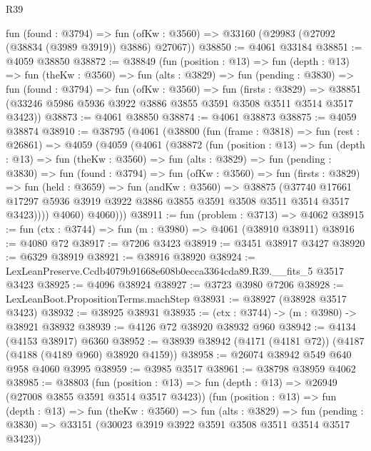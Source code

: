 \begin{lexlean}{R39}
\begin{coremodule}
    fun (found : @3794) =>
    fun (ofKw : @3560) => @33160 (@29983 (@27092 (@38834 (@3989 @3919)) @3886) @27067))
@38850 := @4061 @33184
@38851 := @4059 @38850
@38872 := @38849
    (fun (position : @13) =>
    fun (depth : @13) =>
    fun (theKw : @3560) =>
    fun (alts : @3829) =>
    fun (pending : @3830) =>
    fun (found : @3794) =>
    fun (ofKw : @3560) =>
    fun (firsts : @3829) =>
    @38851 (@33246 @5986 @5936 @3922 @3886 @3855 @3591 @3508 @3511 @3514 @3517 @3423))
@38873 := @4061 @38850
@38874 := @4061 @38873
@38875 := @4059 @38874
@38910 := @38795
    (@4061
      (@38800
        (fun (frame : @3818) =>
        fun (rest : @26861) =>
        @4059
          (@4059
            (@4061
              (@38872
                (fun (position : @13) =>
                fun (depth : @13) =>
                fun (theKw : @3560) =>
                fun (alts : @3829) =>
                fun (pending : @3830) =>
                fun (found : @3794) =>
                fun (ofKw : @3560) =>
                fun (firsts : @3829) =>
                fun (held : @3659) =>
                fun (andKw : @3560) =>
                @38875
                  (@37740
                    @17661
                    @17297
                    @5936
                    @3919
                    @3922
                    @3886
                    @3855
                    @3591
                    @3508
                    @3511
                    @3514
                    @3517
                    @3423))))
            @4060)
          @4060)))
@38911 := fun (problem : @3713) => @4062
@38915 := fun (ctx : @3744) => fun (m : @3980) => @4061 (@38910 @38911)
@38916 := @4080 @72
@38917 := @7206 @3423
@38919 := @3451 @38917 @3427
@38920 := @6329 @38919
@38921 := @38916 @38920
@38924 := LexLeanPreserve.Ccdb4079b91668e608b0ecca3364cda89.R39.__fits_5 @3517 @3423
@38925 := @4096 @38924
@38927 := @3723 @3980 @7206
@38928 := LexLeanBoot.PropositionTerms.machStep
@38931 := @38927 (@38928 @3517 @3423)
@38932 := @38925 @38931
@38935 := (ctx : @3744) -> (m : @3980) -> @38921 @38932
@38939 := @4126 @72 @38920 @38932 @960
@38942 := @4134 (@4153 @38917) @6360
@38952 := @38939 @38942 (@4171 (@4181 @72)) (@4187 (@4188 (@4189 @960) @38920 @4159))
@38958 := @26074 @38942 @549 @640 @958 @4060 @3995
@38959 := @3985 @3517
@38961 := @38798 @38959 @4062
@38985 := @38803
    (fun (position : @13) => fun (depth : @13) => @26949 (@27008 @3855 @3591 @3514 @3517 @3423))
    (fun (position : @13) =>
    fun (depth : @13) =>
    fun (theKw : @3560) =>
    fun (alts : @3829) =>
    fun (pending : @3830) => @33151 (@30023 @3919 @3922 @3591 @3508 @3511 @3514 @3517 @3423))

\end{coremodule}
\end{lexlean}
